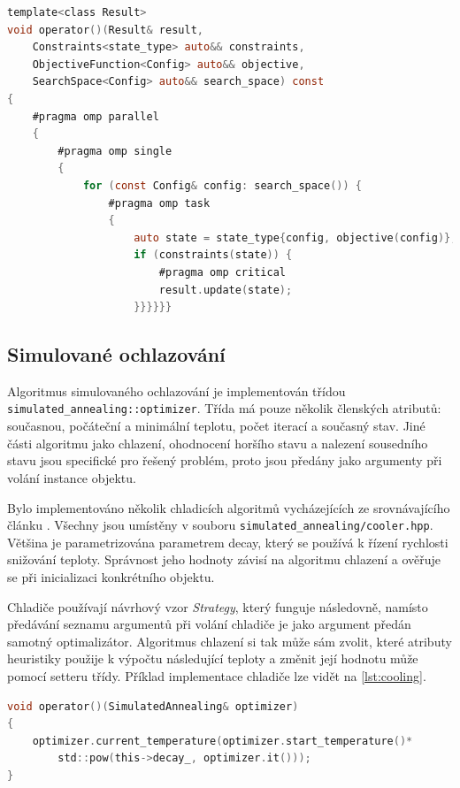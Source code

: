 \begin{lstlisting}[caption={~Optimalizace pomocí algoritmu hrubé síly},label={lst:brute-force},captionpos=t,abovecaptionskip=-\medskipamount,belowcaptionskip=\medskipamount,language=C]
template<class Result>
void operator()(Result& result,
    Constraints<state_type> auto&& constraints,
    ObjectiveFunction<Config> auto&& objective,
    SearchSpace<Config> auto&& search_space) const
{
    #pragma omp parallel
    {
        #pragma omp single
        {
            for (const Config& config: search_space()) {
                #pragma omp task
                {
                    auto state = state_type{config, objective(config)};
                    if (constraints(state)) {
                        #pragma omp critical
                        result.update(state);
                    }}}}}}
\end{lstlisting}

\subsection{Simulované ochlazování}
Algoritmus simulovaného ochlazování je implementován třídou \texttt{simulated\_annealing::optimizer}.
Třída má pouze několik členských atributů: současnou, počáteční a minimální teplotu, počet iterací a současný stav.
Jiné části algoritmu jako chlazení, ohodnocení horšího stavu a nalezení sousedního stavu jsou specifické pro řešený problém, proto jsou předány jako argumenty při volání instance objektu.

Bylo implementováno několik chladicích algoritmů vycházejících ze srovnávajícího článku \cite{cooling-comparison}.
Všechny jsou umístěny v souboru \texttt{simulated\_annealing/cooler.hpp}.
Většina je parametrizována parametrem decay, který se používá k řízení rychlosti snižování teploty.
Správnost jeho hodnoty závisí na algoritmu chlazení a ověřuje se při inicializaci konkrétního objektu.

Chladiče používají návrhový vzor \textit{Strategy}, který funguje následovně, namísto předávání seznamu argumentů při volání chladiče je jako argument předán samotný optimalizátor.
Algoritmus chlazení si tak může sám zvolit, které atributy heuristiky použije k výpočtu následující teploty a změnit její hodnotu může pomocí setteru třídy.
Příklad implementace chladiče lze vidět na \ref{lst:cooling}.

\begin{lstlisting}[caption={~Ukázka implementace chlazení třídy \texttt{simulated\_annealing::exp\_mul\_cooler }},label={lst:cooling},captionpos=t,abovecaptionskip=-\medskipamount,belowcaptionskip=\medskipamount,language=C]
void operator()(SimulatedAnnealing& optimizer)
{
    optimizer.current_temperature(optimizer.start_temperature()*
        std::pow(this->decay_, optimizer.it()));
}
\end{lstlisting}

